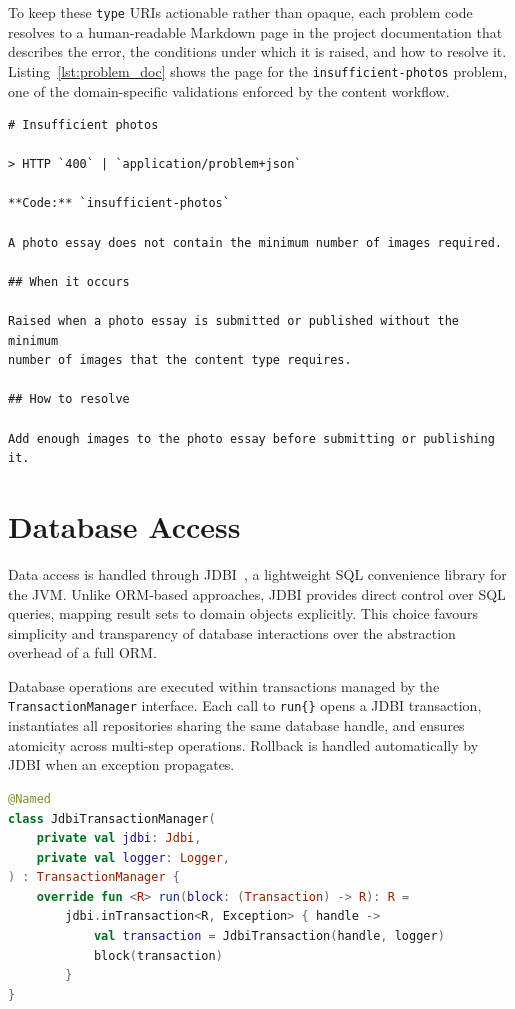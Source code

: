 To keep these \texttt{type} URIs actionable rather than opaque, each problem code
resolves to a human-readable Markdown page in the project documentation that describes
the error, the conditions under which it is raised, and how to resolve it.
Listing~\ref{lst:problem_doc} shows the page for the \texttt{insufficient-photos}
problem, one of the domain-specific validations enforced by the content workflow.

\begin{lstlisting}[caption={Documentation page for the \texttt{insufficient-photos} problem type.},label={lst:problem_doc}]
# Insufficient photos

> HTTP `400` | `application/problem+json`

**Code:** `insufficient-photos`

A photo essay does not contain the minimum number of images required.

## When it occurs

Raised when a photo essay is submitted or published without the minimum
number of images that the content type requires.

## How to resolve

Add enough images to the photo essay before submitting or publishing it.
\end{lstlisting}

\section{Database Access} \label{sec:be_database}

Data access is handled through JDBI~\cite{jdbi}, a lightweight SQL convenience library
for the JVM. Unlike ORM-based approaches, JDBI provides direct control over SQL queries,
mapping result sets to domain objects explicitly. This choice favours simplicity and
transparency of database interactions over the abstraction overhead of a full ORM.

Database operations are executed within transactions managed by the
\texttt{TransactionManager} interface. Each call to \texttt{run\{\}} opens a JDBI
transaction, instantiates all repositories sharing the same database handle, and
ensures atomicity across multi-step operations. Rollback is handled automatically
by JDBI when an exception propagates.

\begin{lstlisting}[language=Kotlin, caption={JdbiTransactionManager implementation.}]
@Named
class JdbiTransactionManager(
    private val jdbi: Jdbi,
    private val logger: Logger,
) : TransactionManager {
    override fun <R> run(block: (Transaction) -> R): R =
        jdbi.inTransaction<R, Exception> { handle ->
            val transaction = JdbiTransaction(handle, logger)
            block(transaction)
        }
}
\end{lstlisting}

